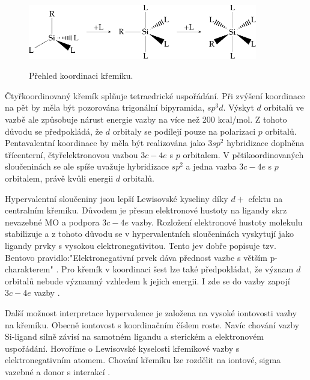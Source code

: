 \documentclass[
  digital, %
  table,   %
  lof,     %
  lot,     %
  oneside,
]{fithesis3}
\begin{document}
\begin{figure}
\caption{Přehled koordinaci křemíku.}
\center \includegraphics[width=10cm]{drawing.pdf} \label{prehled_koordinaci} \end{figure}

Čtyřkoordinovaný křemík splňuje tetraedrické uspořádání. Při zvýšení koordinace na pět by měla být pozorována trigonální bipyramida, $sp^3d$. Výskyt $d$ orbitalů ve vazbě ale způsobuje nárust energie vazby na více než 200 kcal/mol. Z tohoto důvodu se předpokládá, že $d$ orbitaly se podílejí pouze na polarizaci $p$ orbitalů. Pentavalentní koordinace by měla být realizována jako $3sp^2$ hybridizace doplněna třícenterní, čtyřelektronovou vazbou $3c-4e$ s $p$ orbitalem. V pětikoordinovaných sloučeninách se ale spíše uvažuje hybridizace $sp^2$ a jedna vazba $3c-4e$ s $p$ orbitalem, právě kvůli energii $d$ orbitalů.

Hypervalentní sloučeniny jsou lepší Lewisovské kyseliny díky $d+$ efektu na centralním křemíku. Důvodem je přesun elektronové hustoty na ligandy skrz nevazebné MO a podpora $3c-4e$ vazby. Rozložení elektronové hustoty molekulu stabilizuje a z tohoto důvodu se v hypervalentních sloučeninách vyskytují jako ligandy prvky s vysokou elektronegativitou. Tento jev dobře popisuje tzv. Bentovo pravidlo:"Elektronegativní prvek dáva přednost vazbe s větším p-charakterem" \cite{hypervalentsiliconmacmillangroup2005}. Pro křemík v koordinaci šest lze také předpokládat, že význam $d$ orbitalů nebude významný vzhledem k jejich energii. I zde se do vazby zapojí $3c-4e$ vazby \cite{Wagler2014}.

Další možnost interpretace hypervalence je založena na vysoké iontovosti vazby na křemíku. Obecně iontovost s koordinačním číslem roste.
Navíc chování vazby Si-ligand silně závisí na samotném ligandu a sterickém a elektronovém uspořádání. Hovoříme o Lewisovské kyselosti křemíkové vazby s elektronegativním atomem. Chování křemíku lze rozdělit na iontové, sigma vazebné a donor s interakcí \cite{Wagler2014}.\\
\end{document}
